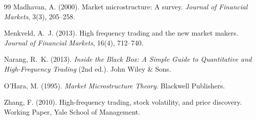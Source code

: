 \documentclass[11pt, letterpaper]{article}
\begin{document}
\begin{thebibliography}{99}
Madhavan, A. (2000).
Market microstructure: A survey.
\textit{Journal of Financial Markets}, 3(3), 205--258.

Menkveld, A.~J. (2013).
High frequency trading and the new market makers.
\textit{Journal of Financial Markets}, 16(4), 712--740.

Narang, R.~K. (2013).
\textit{Inside the Black Box: A Simple Guide to Quantitative and High-Frequency
Trading} (2nd ed.).
John Wiley \& Sons.

O'Hara, M. (1995).
\textit{Market Microstructure Theory}.
Blackwell Publishers.

Zhang, F. (2010).
High-frequency trading, stock volatility, and price discovery.
Working Paper, Yale School of Management.

\end{thebibliography}
\end{document}
